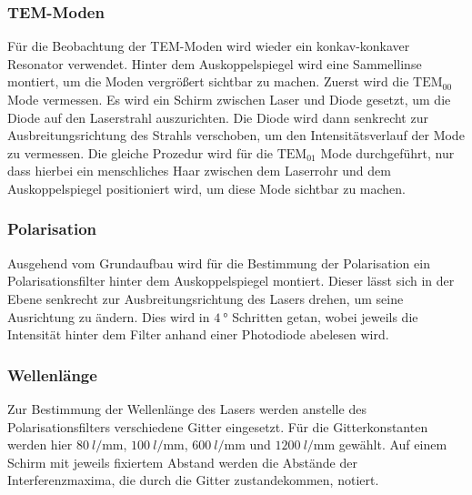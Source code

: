 \subsubsection{TEM-Moden}
Für die Beobachtung der TEM-Moden wird wieder ein konkav-konkaver Resonator verwendet. Hinter dem Auskoppelspiegel wird eine Sammellinse montiert, um die Moden
vergrößert sichtbar zu machen. Zuerst wird die $\text{TEM}_{00} $ Mode vermessen. Es wird ein Schirm zwischen Laser und Diode gesetzt, um die Diode auf den Laserstrahl auszurichten. 
Die Diode wird dann senkrecht zur Ausbreitungsrichtung des Strahls verschoben, um den Intensitätsverlauf der Mode zu vermessen. 
Die gleiche Prozedur wird für die $\text{TEM}_{01} $ Mode durchgeführt, nur dass hierbei ein menschliches Haar zwischen dem Laserrohr und dem Auskoppelspiegel positioniert wird, um 
diese Mode sichtbar zu machen. 

\subsubsection{Polarisation}
Ausgehend vom Grundaufbau wird für die Bestimmung der Polarisation ein Polarisationsfilter hinter dem Auskoppelspiegel montiert. Dieser lässt sich in der Ebene senkrecht zur 
Ausbreitungsrichtung des Lasers drehen, um seine Ausrichtung zu ändern. Dies wird in $\SI{4}{\degree}$ Schritten getan, wobei jeweils die Intensität hinter dem Filter anhand einer 
Photodiode abelesen wird. 

\subsubsection{Wellenlänge}
Zur Bestimmung der Wellenlänge des Lasers werden anstelle des Polarisationsfilters verschiedene Gitter eingesetzt. Für die Gitterkonstanten werden hier $\SI{80}{l/\mm}$, $\SI{100}{l/\mm}$, $\SI{600}{l/\mm}$ und 
$\SI{1200}{l/\mm}$ gewählt. Auf einem Schirm mit jeweils fixiertem Abstand werden die Abstände der Interferenzmaxima, die durch die Gitter zustandekommen, notiert. 

